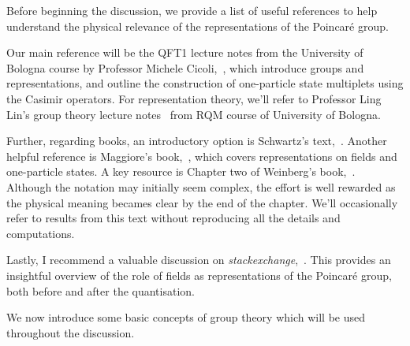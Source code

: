 Before beginning the discussion, we provide a list of useful references to help understand the physical relevance of the representations of the Poincaré group. 

Our main reference will be the QFT1 lecture notes from the University of Bologna course by Professor Michele Cicoli,~\cite{cicoli}, which introduce groups and representations, and outline the construction of one-particle state multiplets using the Casimir operators. For representation theory, we'll refer to Professor Ling Lin's group theory lecture notes~\cite{ling} from RQM course of University of Bologna.

Further, regarding books, an introductory option is Schwartz's text,~\cite{schwartz}. Another helpful reference is Maggiore's book,~\cite{maggiore}, which covers representations on fields and one-particle states. A key resource is Chapter two of Weinberg's book,~\cite{weinberg}. Although the notation may initially seem complex, the effort is well rewarded as the physical meaning becames clear by the end of the chapter. We'll occasionally refer to results from this text without reproducing all the details and computations.

Lastly, I recommend a valuable discussion on \emph{stackexchange},~\cite{stackexchange}. This provides an insightful overview of the role of fields as representations of the Poincaré group, both before and after the quantisation.

We now introduce some basic concepts of group theory which will be used throughout the discussion.